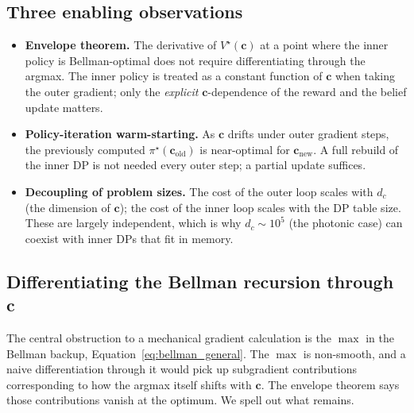 \documentclass[11pt]{article}
\newcommand{\bc}{\bm{c}}
\begin{document}
\subsection{Three enabling observations}

\begin{itemize}[nosep, leftmargin=*]
\item \textbf{Envelope theorem.}  The derivative of $V^\star(\bc)$ at a point where the inner policy is Bellman-optimal does not require differentiating through the argmax.  The inner policy is treated as a constant function of $\bc$ when taking the outer gradient; only the \emph{explicit} $\bc$-dependence of the reward and the belief update matters.
\item \textbf{Policy-iteration warm-starting.}  As $\bc$ drifts under outer gradient steps, the previously computed $\pi^\star(\bc_{\mathrm{old}})$ is near-optimal for $\bc_{\mathrm{new}}$.  A full rebuild of the inner DP is not needed every outer step; a partial update suffices.
\item \textbf{Decoupling of problem sizes.}  The cost of the outer loop scales with $d_c$ (the dimension of $\bc$); the cost of the inner loop scales with the DP table size.  These are largely independent, which is why $d_c \sim 10^5$ (the photonic case) can coexist with inner DPs that fit in memory.
\end{itemize}

\subsection{Differentiating the Bellman recursion through \texorpdfstring{$\bc$}{c}}

The central obstruction to a mechanical gradient calculation is the $\max$ in the Bellman backup, Equation~\eqref{eq:bellman_general}.  The $\max$ is non-smooth, and a naive differentiation through it would pick up subgradient contributions corresponding to how the argmax itself shifts with $\bc$.  The envelope theorem says those contributions vanish at the optimum.  We spell out what remains.
\end{document}
